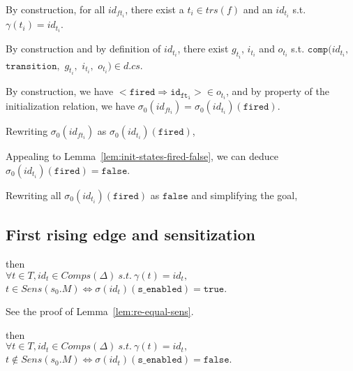 \documentclass[dvipsnames,12pt]{article}
\begin{document}
\begin{niproof}
\begin{itemize}
    By construction, for all $id_{ft_i}$, there exist a
    $t_i\in{}trs(f)$ and an $id_{t_i}$ s.t. $\gamma(t_i)=id_{t_i}$.

    By construction and by definition of $id_{t_i}$, there exist
    $g_{t_i}$, $i_{t_i}$ and $o_{t_i}$ s.t.
    $\mathtt{comp}($$id_{t_i},$ $\texttt{transition},$
    $g_{t_i},$ $i_{t_i},$ $o_{t_i})\in{}d.cs$.

    By construction, we have
    ${<}\mathtt{fired\Rightarrow{id_{ft_i}}}{>}\in{}o_{t_i}$, and by
    property of the initialization relation, we have
    $\sigma_0(id_{ft_i})=\sigma_0(id_{t_i})(\texttt{fired})$.

    \noindent{}Rewriting $\sigma_0(id_{ft_i})$ as
    $\sigma_0(id_{t_i})(\texttt{fired})$,

    Appealing to Lemma~\ref{lem:init-states-fired-false}, we can
    deduce $\sigma_0(id_{t_i})(\texttt{fired})=\mathtt{false}$.

    Rewriting all $\sigma_0(id_{t_i})(\texttt{fired})$ as $\mathtt{false}$
    and simplifying the goal, 
    
  \end{itemize}

\end{niproof}

\subsection{First rising edge and sensitization}
\label{sec:fst-re-sens}

\begin{lemma}
  \label{lem:fst-re-equal-sens}
  \fstrehyps{} then\\
  $\forall{}t\in{}T,id_t\in{}Comps(\Delta)~s.t.~\gamma(t)=id_t,$
  $t\in{}Sens(s_0.M)\Leftrightarrow\sigma(id_t)(\texttt{s\_enabled})=\mathtt{true}$.
\end{lemma}

\begin{niproof}
  See the proof of Lemma~\ref{lem:re-equal-sens}.
\end{niproof}

\begin{lemma}
  \label{lem:fst-re-neq-sens}
  \fstrehyps{} then\\
  $\forall{}t\in{}T,id_t\in{}Comps(\Delta)~s.t.~\gamma(t)=id_t,$
  $t\notin{}Sens(s_0.M)\Leftrightarrow\sigma(id_t)(\texttt{s\_enabled})=\mathtt{false}$.
\end{lemma}
\end{document}
